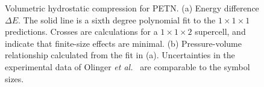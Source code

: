 \documentclass[prb,aps,nobibnotes,superbib,preprint]{revtex4}
\begin{document}
\begin{figure}
\caption{Volumetric hydrostatic compression for PETN.
(a) Energy difference $\Delta E$. The solid line is a sixth degree
polynomial fit to the $1\times 1\times 1$ predictions.  Crosses are
calculations for a $1\times 1\times 2$ supercell, and indicate that
finite-size effects are minimal.  (b) Pressure-volume relationship
calculated from the fit in (a).  Uncertainties in the experimental
data of Olinger {\it et al.}~\cite{Olinger_1975v62} are comparable to 
the symbol sizes.  }
\label{fig:volume_compress}
\end{figure}
\end{document}

